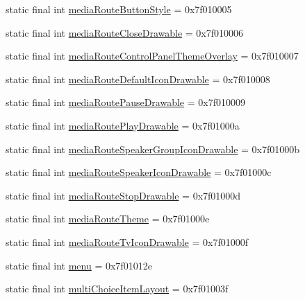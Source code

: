 \begin{CompactItemize}
\item 
static final int \hyperlink{classandroid_1_1support_1_1v7_1_1mediarouter_1_1_r_1_1attr_099e644d48a517581001a0315b603770}{mediaRouteButtonStyle} = 0x7f010005
\item 
static final int \hyperlink{classandroid_1_1support_1_1v7_1_1mediarouter_1_1_r_1_1attr_3abe369dcb84554a20c4f75ff86b96db}{mediaRouteCloseDrawable} = 0x7f010006
\item 
static final int \hyperlink{classandroid_1_1support_1_1v7_1_1mediarouter_1_1_r_1_1attr_e802179480a4811db38a00f9a1a07914}{mediaRouteControlPanelThemeOverlay} = 0x7f010007
\item 
static final int \hyperlink{classandroid_1_1support_1_1v7_1_1mediarouter_1_1_r_1_1attr_0a06372e06c11dc6d0a1e1cc27db3317}{mediaRouteDefaultIconDrawable} = 0x7f010008
\item 
static final int \hyperlink{classandroid_1_1support_1_1v7_1_1mediarouter_1_1_r_1_1attr_139e92a7ef9b7df6cc96bfe558de63ae}{mediaRoutePauseDrawable} = 0x7f010009
\item 
static final int \hyperlink{classandroid_1_1support_1_1v7_1_1mediarouter_1_1_r_1_1attr_6c98e91c4adec80d14b74879eed54889}{mediaRoutePlayDrawable} = 0x7f01000a
\item 
static final int \hyperlink{classandroid_1_1support_1_1v7_1_1mediarouter_1_1_r_1_1attr_9cfd1efdcc7a12717fe62e04b173128a}{mediaRouteSpeakerGroupIconDrawable} = 0x7f01000b
\item 
static final int \hyperlink{classandroid_1_1support_1_1v7_1_1mediarouter_1_1_r_1_1attr_f1e079f8bc2276df9df92191ea29ac3d}{mediaRouteSpeakerIconDrawable} = 0x7f01000c
\item 
static final int \hyperlink{classandroid_1_1support_1_1v7_1_1mediarouter_1_1_r_1_1attr_bcf441bb74b1e8f16d6af80434972a8b}{mediaRouteStopDrawable} = 0x7f01000d
\item 
static final int \hyperlink{classandroid_1_1support_1_1v7_1_1mediarouter_1_1_r_1_1attr_556072d70df6f3856c088c2cd28bbc9d}{mediaRouteTheme} = 0x7f01000e
\item 
static final int \hyperlink{classandroid_1_1support_1_1v7_1_1mediarouter_1_1_r_1_1attr_59564238f48d0aff2846f8b5dee03802}{mediaRouteTvIconDrawable} = 0x7f01000f
\item 
static final int \hyperlink{classandroid_1_1support_1_1v7_1_1mediarouter_1_1_r_1_1attr_569159b255e81bd388ad5e913d99ca48}{menu} = 0x7f01012e
\item 
static final int \hyperlink{classandroid_1_1support_1_1v7_1_1mediarouter_1_1_r_1_1attr_a195d128d525e08364021fe4305285c6}{multiChoiceItemLayout} = 0x7f01003f

\end{CompactItemize}
